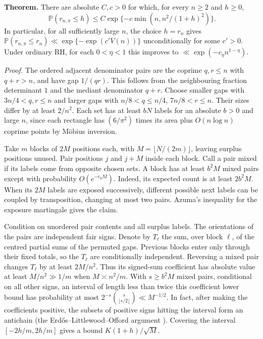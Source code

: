 \documentclass[11pt,a4paper]{article}
\begin{document}
\medskip\noindent\textbf{Theorem.}
There are absolute $C,c>0$ for which, for every $n\ge2$ and $h\ge0$,
\[
 \mathbb P(r_{n,\pi}\le h)
 \le C\exp\{-c\min(n,n^2/(1+h)^2)\}.
\]
In particular, for all sufficiently large $n$, the choice $h=r_n$
gives $\mathbb P(r_{n,\pi}\le r_n)\ll\exp\{-\exp(c'V(n))\}$
unconditionally for some $c'>0$. Under ordinary RH, for each
$0<\eta<1$ this improves to $\ll\exp(-c_\eta n^{1-\eta})$.

\medskip\noindent\emph{Proof.}
The ordered adjacent denominator pairs are the coprime $q,r\le n$
with $q+r>n$, and have gap $1/(qr)$. This follows from the neighbouring
fraction determinant $1$ and the mediant denominator $q+r$.
Choose smaller gaps with $3n/4<q,r\le n$ and larger gaps with
$n/8<q\le n/4$, $7n/8<r\le n$. Their sizes differ by
at least $2/n^2$. Each set has at least $bN$ labels for an absolute
$b>0$ and large $n$, since each rectangle has $(6/\pi^2)$ times its
area plus $O(n\log n)$ coprime points by M\"obius inversion.

Take $m$ blocks of $2M$ positions each, with $M=\lfloor N/(2m)\rfloor$,
leaving surplus positions unused. Pair positions $j$ and $j+M$ inside
each block. Call a pair mixed if its labels come from opposite chosen
sets. A block has at least $b^2M$ mixed pairs except with probability
$O(e^{-c_0M})$. Indeed, its expected count is at least $2b^2M$.
When its $2M$ labels are exposed successively, different possible next
labels can be coupled by transposition, changing at most two pairs.
Azuma's inequality for the exposure martingale gives the claim.

Condition on unordered pair contents and all surplus labels. The
orientations of the pairs are independent fair signs. Denote by
$T_\ell$ the sum, over block $\ell$, of the centred partial sums of
the permuted gaps. Previous blocks enter only through their fixed
totals, so the $T_\ell$ are conditionally independent. Reversing a mixed
pair changes $T_\ell$ by at least $2M/n^2$. Thus its signed-sum
coefficient has absolute value at least $M/n^2\gg1/m$ when
$M\asymp n^2/m$. With $s\ge b^2M$ mixed pairs, conditional on all
other signs, an interval of length less than twice this coefficient
lower bound has probability at most
$2^{-s}\binom{s}{\lfloor s/2\rfloor}\ll M^{-1/2}$.
In fact, after making the coefficients positive, the subsets of
positive signs hitting the interval form an antichain (the
Erd\H{o}s--Littlewood--Offord argument \cite{erdoslo}). Covering the
interval $[-2h/m,2h/m]$ gives a bound $K(1+h)/\sqrt M$.
\end{document}
